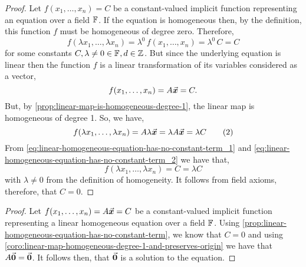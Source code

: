 \documentclass[../MathsNotesBase.tex]{subfiles}
\begin{document}
{		\bigskip
		\begin{tcolorbox}[breakable,enhanced jigsaw,colframe=white,colback=white,boxrule=0pt,arc=0pt,left=0pt,right=0pt,top=0pt,bottom=0pt]
			\begin{proof}
				Let ${ f(x_1,\dots,x_n) = C }$ be a constant-valued implicit function representing an equation over a field $\mathbb{F}^{}$. If the equation is homogeneous then, by the definition, this function $f$ must be homogeneous of degree zero. Therefore,
				\begin{equation} f(\lambda x_1,\dots,\lambda x_n) = \lambda^0 \, f(x_1,\dots,x_n) = \lambda^0 \, C = C  \tag{1}
					\label{eq:linear-homogeneous-equation-has-no-constant-term_1} 
				\end{equation}
				for some constants ${ C, \lambda \neq 0 \in \mathbb{F}^{}, d \in \mathbb{Z}^{} }$. But since the underlying equation is linear then the function $f$ is a linear transformation of its variables considered as a vector,
				\[ f(x_1,\dots,x_n) = A\vec{\bm{x}} = C. \]
				But, by \autoref{prop:linear-map-is-homogeneous-degree-1}, the linear map is homogeneous of degree 1. So, we have,
				\begin{equation} f(\lambda x_1,\dots,\lambda x_n) = A\lambda\vec{\bm{x}} = \lambda A\vec{\bm{x}} = \lambda C \tag{2} 
					\label{eq:linear-homogeneous-equation-has-no-constant-term_2}
				\end{equation}
				From \eqref{eq:linear-homogeneous-equation-has-no-constant-term_1} and \eqref{eq:linear-homogeneous-equation-has-no-constant-term_2} we have that,
				\[ f(\lambda x_1,\dots,\lambda x_n) = C = \lambda C \]
				with ${ \lambda \neq 0 }$ from the definition of homogeneity. It follows from field axioms, therefore, that ${ C = 0 }$.
			\end{proof}
		\end{tcolorbox}
	
		\bigskip
		\begin{tcolorbox}[breakable,enhanced jigsaw,colframe=white,colback=white,boxrule=0pt,arc=0pt,left=0pt,right=0pt,top=0pt,bottom=0pt]
			\begin{proof}
				Let ${ f(x_1,\dots,x_n) = A\vec{\bm{x}} = C }$ be a constant-valued implicit function representing a linear homogeneous equation over a field $\mathbb{F}^{}$. Using \autoref{prop:linear-homogeneous-equation-has-no-constant-term}, we know that ${ C = 0 }$ and using \autoref{coro:linear-map-homogeneous-degree-1-and-preserves-origin} we have that ${ A\vec{\bm{0}} = \vec{\bm{0}} }$. It follows then, that $\vec{\bm{0}}$ is a solution to the equation.
			\end{proof}
		\end{tcolorbox}
	
}
\end{document}
